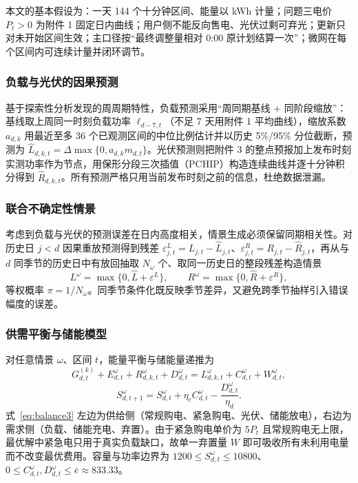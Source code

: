 本文的基本假设为：一天 144 个十分钟区间、能量以 kWh 计量；问题三电价 $P_t>0$ 为附件 1 固定日内曲线；用户侧不能反向售电、光伏过剩可弃光；更新只对未开始区间生效；主口径按“最终调整量相对 0:00 原计划结算一次”；微网在每个区间内可连续计量并闭环调节。

\subsubsection{负载与光伏的因果预测}

基于探索性分析发现的周周期特性，负载预测采用“周同期基线 + 同阶段缩放”：基线取上周同一时刻负载功率 $\ell_{d-7,t}$（不足 7 天用附件 1 平均曲线），缩放系数 $a_{d,k}$ 用最近至多 36 个已观测区间的中位比例估计并以历史 5\%/95\% 分位截断，预测为 $\widehat L_{d,k,t}=\Delta\max\{0,a_{d,k}m_{d,t}\}$。光伏预测则把附件 3 的整点预报加上发布时刻实测功率作为节点，用保形分段三次插值（PCHIP）构造连续曲线并逐十分钟积分得到 $\widehat R_{d,k,t}$。所有预测严格只用当前发布时刻之前的信息，杜绝数据泄漏。

\subsubsection{联合不确定性情景}

考虑到负载与光伏的预测误差在日内高度相关，情景生成必须保留同期相关性。对历史日 $j<d$ 因果重放预测得到残差 $\varepsilon^L_{j,t}=L_{j,t}-\widehat L_{j,t}$、$\varepsilon^R_{j,t}=R_{j,t}-\widehat R_{j,t}$，再从与 $d$ 同季节的历史日中有放回抽取 $N_\omega$ 个、取同一历史日的整段残差构造情景
\begin{equation}
L^\omega=\max\{0,\widehat L+\varepsilon^L\},\qquad R^\omega=\max\{0,\widehat R+\varepsilon^R\},\label{eq:scenario3}
\end{equation}
等权概率 $\pi=1/N_\omega$。同季节条件化既反映季节差异，又避免跨季节抽样引入错误幅度的误差。

\subsubsection{供需平衡与储能模型}

对任意情景 $\omega$、区间 $t$，能量平衡与储能量递推为
\begin{equation}
G^{(k)}_{d,t}+E^\omega_{d,t}+R^\omega_{d,k,t}+D^\omega_{d,t}=L^\omega_{d,k,t}+C^\omega_{d,t}+W^\omega_{d,t},\label{eq:balance3}
\end{equation}
\begin{equation}
S^\omega_{d,t+1}=S^\omega_{d,t}+\eta_c C^\omega_{d,t}-\frac{D^\omega_{d,t}}{\eta_d}.\label{eq:soc3}
\end{equation}
式~\eqref{eq:balance3} 左边为供给侧（常规购电、紧急购电、光伏、储能放电），右边为需求侧（负载、储能充电、弃置）。由于紧急购电单价为 $5P_t$ 且常规购电无上限，最优解中紧急电只用于真实负载缺口，故单一弃置量 $W$ 即可吸收所有未利用电量而不改变最优费用。容量与功率边界为 $1200\le S^\omega_{d,t}\le10800$、$0\le C^\omega_{d,t},D^\omega_{d,t}\le\bar e\approx833.33$。

